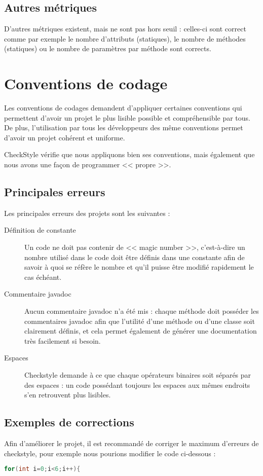\documentclass[12pt,a4paper,openany]{book}
\begin{document}
	\section{Autres métriques}
	D'autres métriques existent, mais ne sont pas hors seuil : celles-ci sont correct comme par exemple le nombre d'attributs (statiques), le nombre de
	méthodes (statiques) ou le nombre de paramètres par méthode sont corrects. 

	\chapter{Conventions de codage}\label{conventions}
	Les conventions de codages demandent d'appliquer certaines conventions qui permettent d'avoir un projet le plus lisible possible et compréhensible
	par tous. De plus, l'utilisation par tous les développeurs des même conventions permet d'avoir un projet cohérent et uniforme. 

	CheckStyle vérifie que nous appliquons bien ses conventions, mais également que nous avons une façon de programmer << propre >>.

	\section{Principales erreurs}
	Les principales erreurs des projets sont les suivantes : 
	\begin{description}
		\item[Définition de constante] Un code ne doit pas contenir de << magic number >>, c'est-à-dire un nombre utilisé dans le code doit être définis
			dans une constante afin de savoir à quoi se réfère le nombre et qu'il puisse être modifié rapidement le cas échéant.
		\item[Commentaire javadoc] Aucun commentaire javadoc n'a été mis : chaque méthode doit posséder les commentaires javadoc afin que l'utilité
			d'une méthode ou d'une classe soit clairement définis, et cela permet également de générer une documentation très facilement si besoin.
		\item[Espaces] Checkstyle demande à ce que chaque opérateurs binaires soit séparés par des espaces : un code possédant toujours les espaces aux
			mêmes endroits s'en retrouvent plus lisibles.
	\end{description}

	\section{Exemples de corrections}
	Afin d'améliorer le projet, il est recommandé de corriger le maximum d'erreurs de checkstyle, pour exemple nous pourions modifier le code
	ci-dessous :
	\begin{lstlisting}[language=Java,numbers=none]
for(int i=0;i<6;i++){
\end{lstlisting}
\end{document}
